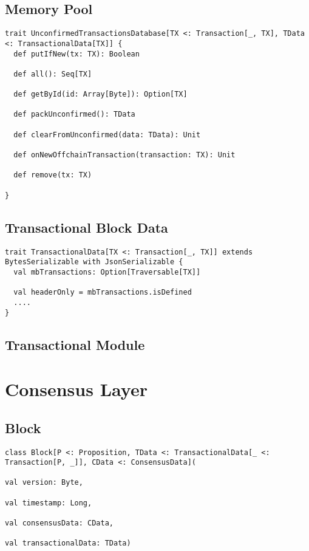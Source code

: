 \documentclass[]{report}   %
\begin{document}
\subsection{Memory Pool}

\begin{lstlisting}
trait UnconfirmedTransactionsDatabase[TX <: Transaction[_, TX], TData <: TransactionalData[TX]] {
  def putIfNew(tx: TX): Boolean

  def all(): Seq[TX]

  def getById(id: Array[Byte]): Option[TX]

  def packUnconfirmed(): TData

  def clearFromUnconfirmed(data: TData): Unit

  def onNewOffchainTransaction(transaction: TX): Unit

  def remove(tx: TX)
  
}
\end{lstlisting}

\subsection{Transactional Block Data}

\begin{lstlisting}
trait TransactionalData[TX <: Transaction[_, TX]] extends BytesSerializable with JsonSerializable {
  val mbTransactions: Option[Traversable[TX]]

  val headerOnly = mbTransactions.isDefined
  ....
}
\end{lstlisting}

\subsection{Transactional Module}



\section{Consensus Layer}

\subsection{Block}

\begin{lstlisting}
class Block[P <: Proposition, TData <: TransactionalData[_ <: Transaction[P, _]], CData <: ConsensusData](
                                                                                      val version: Byte,
                                                                                      val timestamp: Long,
                                                                                      val consensusData: CData,
                                                                                      val transactionalData: TData)
\end{lstlisting}
\end{document}
